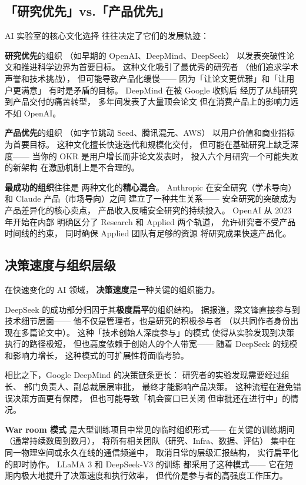 \subsection{「研究优先」vs.「产品优先」}

AI 实验室的核心文化选择
往往决定了它们的发展轨迹：

\textbf{研究优先}的组织
（如早期的 OpenAI、DeepMind、DeepSeek）
以发表突破性论文和推进科学边界为首要目标。
这种文化吸引了最优秀的研究者
（他们追求学术声誉和技术挑战），
但可能导致产品化缓慢——
因为「让论文更优雅」和「让用户更满意」
有时是矛盾的目标。
DeepMind 在被 Google 收购后
经历了从纯研究到产品交付的痛苦转型，
多年间发表了大量顶会论文
但在消费产品上的影响力远不如 OpenAI。

\textbf{产品优先}的组织
（如字节跳动 Seed、腾讯混元、AWS）
以用户价值和商业指标为首要目标。
这种文化擅长快速迭代和规模化交付，
但可能在基础研究上缺乏深度——
当你的 OKR 是用户增长而非论文发表时，
投入六个月研究一个可能失败的新架构
在激励机制上是不合理的。

\textbf{最成功的组织}往往是
两种文化的\textbf{精心混合}。
Anthropic 在安全研究（学术导向）
和 Claude 产品（市场导向）之间
建立了一种共生关系——
安全研究的突破成为产品差异化的核心卖点，
产品收入反哺安全研究的持续投入。
OpenAI 从 2023 年开始在内部
明确区分了 Research 和 Applied 两个轨道，
允许研究者不受产品时间线的约束，
同时确保 Applied 团队有足够的资源
将研究成果快速产品化。

\subsection{决策速度与组织层级}

在快速变化的 AI 领域，
\textbf{决策速度}是一种关键的组织能力。

DeepSeek 的成功部分归因于其\textbf{极度扁平}的组织结构。
据报道，梁文锋直接参与到技术细节层面——
他不仅是管理者，也是研究的积极参与者
（以共同作者身份出现在多篇论文中）。
这种「技术创始人深度参与」的模式
使得从实验发现到决策执行的路径极短，
但也高度依赖于创始人的个人带宽——
随着 DeepSeek 的规模和影响力增长，
这种模式的可扩展性将面临考验。

相比之下，Google DeepMind 的决策链条更长：
研究者的实验发现需要经过组长、
部门负责人、副总裁层层审批，
最终才能影响产品决策。
这种流程在避免错误决策方面更有保障，
但也可能导致「机会窗口已关闭
但审批还在进行中」的情况。

\textbf{War room 模式}
是大型训练项目中常见的临时组织形式——
在关键的训练期间（通常持续数周到数月），
将所有相关团队（研究、Infra、数据、评估）
集中在同一物理空间或永久在线的通信频道中，
取消日常的层级汇报结构，
实行扁平化的即时协作。
LLaMA 3 和 DeepSeek-V3 的训练
都采用了这种模式——
它在短期内极大地提升了决策速度和执行效率，
但代价是参与者的高强度工作压力。

